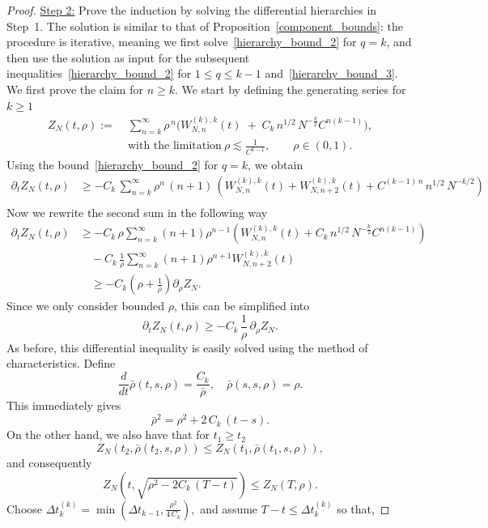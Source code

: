 \documentclass[pdflatex,sn-mathphys-num]{sn-jnl}
\theoremstyle{thmstyleone}%
\theoremstyle{thmstyletwo}%
\theoremstyle{thmstylethree}%
\begin{document}
\begin{proof}
\noindent
\underline{Step 2:} Prove the induction by solving the differential hierarchies in Step~1.
The solution is similar to that of Proposition~\ref{component_bounds}: the procedure is iterative, meaning we first solve~\eqref{hierarchy_bound_2} for $q=k$,
and then use the solution as input for the subsequent inequalities~\eqref{hierarchy_bound_2} for $1\leq q\leq k-1$ and~\eqref{hierarchy_bound_3}. We first prove the claim for $n \geq k$. We start by defining the generating series for \(k \geq 1\)
\[
\begin{aligned}
Z_{N}(t, \rho)
:=\;& 
\sum_{n=k}^{\infty} 
    \rho^{\,n}
    \Bigg(
        W^{(k),k}_{N,n}(t)
        \;+\;
        C_k\,n^{1/2}\,N^{-\frac{k}{2}}
        C^{n(k-1)}
    \Bigg),
\\[6pt]
&\text{with the limitation}\ 
\rho \lesssim \frac{1}{C^{k-1}},
\qquad 
\rho \in (0,1).
\end{aligned}
\]
Using the bound~\eqref{hierarchy_bound_2} for $q=k$, we obtain 
\[
\begin{aligned}
\partial_t Z_N(t, \rho)
&\geq- C_k\, \sum_{n=k}^{\infty} \rho^n\,(n+1)\, \left( W^{(k),k}_{N,n}(t) + W^{(k),k}_{N,n+2}(t) +C^{(k-1)\,n}\,n^{1/2}\, {N^{-k/2}} \right) \\
\end{aligned}
\] 
Now we rewrite the second sum in the following way
\begin{align*}
\partial_t Z_N(t,\rho)
&\geq -C_k\, \rho
\sum_{n=k}^{\infty} (n+1) \rho^{n-1} (
W^{(k),k}_{N,n}(t)+C_k\,n^{1/2}\,N^{-\frac{k}{2}}
        C^{n(k-1)}) \\
&\quad - C_k\, \frac{1}{\rho} 
\sum_{n=k}^{\infty} (n+1) \rho^{n+1}
W^{(k),k}_{N,n+2}(t) \\
& \quad \geq -C_k ( \rho + \frac{1}{\rho} ) \partial_{\rho} Z_N.
\end{align*} 
%
Since we only consider bounded $\rho$, this can be simplified into
\[
\partial_t Z_N(t, \rho)
\geq -C_k\, \frac{1}{\rho}\, \partial_{\rho} Z_N.
\]
As before, this differential inequality is easily solved using the method of characteristics. Define
\[
\frac{d}{dt}\bar\rho(t,s,\rho)=\frac{C_k}{\bar\rho},\quad\bar\rho(s,s,\rho)=\rho.
\]
This immediately gives
\[
\bar\rho^{2}=\rho^2+2\,C_k\,(t-s).
\]
On the other hand, we also have that for $t_1\geq t_2$
\[
Z_{N}(t_2, \bar \rho(t_2,s,\rho)) \leq Z_{N}(t_1, \bar\rho(t_1,s,\rho)),
\] 
and consequently
\[
Z_{N}(t, \sqrt{\rho^2 - 2C_k\,(T-t)}) \leq Z_{N}(T, \rho).
\]
Choose \( \Delta t_k^{(k)} =  \min\left(\Delta t_{k-1}, \frac{\rho^2}{4\,C_k}\right),\) and assume \( T - t \leq \Delta t_k^{(k)} \) so that, 

\end{proof}
\end{document}
